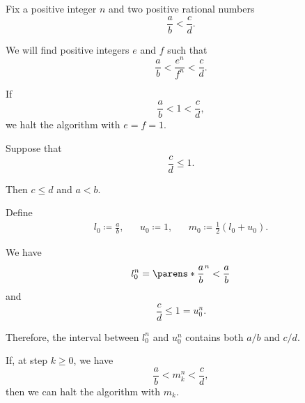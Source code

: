 \begin{algorithm}\label{alg:rational_number_power_bisection}
  Fix a positive integer \( n \) and two positive rational numbers
  \begin{equation*}
    \frac a b < \frac c d.
  \end{equation*}

  We will find positive integers \( e \) and \( f \) such that
  \begin{equation}\label{eq:alg:rational_power_bisection/condition}
    \frac a b < \frac {e^n} {f^n} < \frac c d.
  \end{equation}

  \begin{thmenum}
     If
    \begin{equation*}
      \frac a b < 1 < \frac c d,
    \end{equation*}
    we halt the algorithm with \( e = f = 1 \).

     Suppose that
    \begin{equation*}
      \frac c d \leq 1.
    \end{equation*}

    Then \( c \leq d \) and \( a < b \).

    \begin{thmenum}
       Define
      \begin{align*}
        l_0 \coloneqq \frac a b,
        &&
        u_0 \coloneqq 1,
        &&
        m_0 \coloneqq \frac 1 2 (l_0 + u_0).
      \end{align*}

      We have
      \begin{equation*}
        l_0^n = \parens*{ \frac a b }^n < \frac a b
      \end{equation*}
      and
      \begin{equation*}
        \frac c d \leq 1 = u_0^n.
      \end{equation*}

      Therefore, the interval between \( l_0^n \) and \( u_0^n \) contains both \( a / b \) and \( c / d \).

       If, at step \( k \geq 0 \), we have
      \begin{equation*}
        \frac a b < m_k^n < \frac c d,
      \end{equation*}
      then we can halt the algorithm with \( m_k \).


\end{thmenum}
\end{thmenum}
\end{algorithm}
